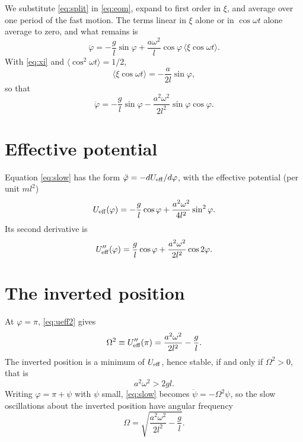 \documentclass{article}
\begin{document}
We substitute \eqref{eq:split} in \eqref{eq:eom}, expand to first order in $\xi$, and average over one period of the fast motion. The terms linear in $\xi$ alone or in $\cos\omega t$ alone average to zero, and what remains is
\begin{equation}
  \ddot\varphi = -\frac{g}{l}\sin\varphi + \frac{a\omega^2}{l}\cos\varphi\,\langle\xi\cos\omega t\rangle .
  \label{eq:slow-avg}
\end{equation}
With \eqref{eq:xi} and $\langle\cos^2\omega t\rangle = 1/2$,
\begin{equation}
  \langle\xi\cos\omega t\rangle = -\frac{a}{2l}\sin\varphi ,
  \label{eq:corr}
\end{equation}
so that
\begin{equation}
  \ddot\varphi = -\frac{g}{l}\sin\varphi - \frac{a^2\omega^2}{2l^2}\sin\varphi\cos\varphi .
  \label{eq:slow}
\end{equation}

\section{Effective potential}
Equation \eqref{eq:slow} has the form $\ddot\varphi = -dU_{\rm eff}/d\varphi$, with the effective potential (per unit $ml^2$)
\begin{equation}
  U_{\rm eff}(\varphi) = -\frac{g}{l}\cos\varphi + \frac{a^2\omega^2}{4l^2}\sin^2\varphi .
  \label{eq:ueff}
\end{equation}
Its second derivative is
\begin{equation}
  U_{\rm eff}''(\varphi) = \frac{g}{l}\cos\varphi + \frac{a^2\omega^2}{2l^2}\cos 2\varphi .
  \label{eq:ueff2}
\end{equation}

\section{The inverted position}
At $\varphi = \pi$, \eqref{eq:ueff2} gives
\begin{equation}
  \Omega^2 \equiv U_{\rm eff}''(\pi) = \frac{a^2\omega^2}{2l^2} - \frac{g}{l} .
  \label{eq:Omega2}
\end{equation}
The inverted position is a minimum of $U_{\rm eff}$, hence stable, if and only if $\Omega^2>0$, that is
\begin{equation}
  a^2\omega^2 > 2gl .
  \label{eq:condition}
\end{equation}
Writing $\varphi = \pi + \psi$ with $\psi$ small, \eqref{eq:slow} becomes $\ddot\psi = -\Omega^2\psi$, so the slow oscillations about the inverted position have angular frequency
\begin{equation}
  \Omega = \sqrt{\frac{a^2\omega^2}{2l^2} - \frac{g}{l}} .
  \label{eq:freq}
\end{equation}
\end{document}
